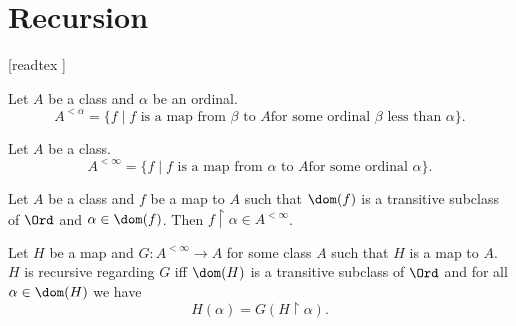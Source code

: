 \documentclass[../../set-theory/set-theory.tex]{subfiles}
\begin{document}
  \chapter{Recursion}\label{chapter:recursion}


  \begin{forthel}

    [readtex ]

  \end{forthel}


  \begin{forthel}
    \begin{definition}
      Let $A$ be a class and $\alpha$ be an ordinal.
      \[ A^{< \alpha} = \{ f \mid \text{$f$ is a map from $\beta$ to $A$
      for some ordinal $\beta$ less than $\alpha$} \}. \]
    \end{definition}
  \end{forthel}

  \begin{forthel}
    \begin{definition}
      Let $A$ be a class.
      \[ A^{< \infty} = \{f \mid \text{$f$ is a map from $\alpha$ to $A$
      for some ordinal $\alpha$} \}. \]
    \end{definition}
  \end{forthel}

  \begin{forthel}
    \begin{lemma}
      Let $A$ be a class and $f$ be a map to $A$ such that $\dom(f)$ is a
      transitive subclass of $\Ord$ and $\alpha \in \dom(f)$.
      Then $f \restriction \alpha \in A^{< \infty}$.
    \end{lemma}
  \end{forthel}

  \begin{forthel}
    \begin{definition}
      Let $H$ be a map and $G : A^{< \infty} \to A$ for some class $A$ such
      that $H$ is a map to $A$.
      $H$ is recursive regarding $G$ iff $\dom(H)$ is a transitive subclass of
      $\Ord$ and for all $\alpha \in \dom(H)$ we have
      \[ H(\alpha) = G(H \restriction \alpha). \]
    \end{definition}
  \end{forthel}
\end{document}
